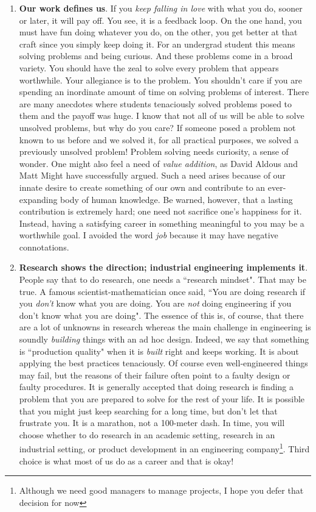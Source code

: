 \documentclass[a6paper]{article}
\begin{document}
\begin{enumerate}
    \item \textbf{Our work defines us}. If you \emph{keep falling in love} with what you do, sooner or later, it will pay off. You see, it is a feedback loop. On the one hand, you must have fun doing whatever you do, on the other, you get better at that craft since you simply keep doing it. For an undergrad student this means solving problems and being curious. And these problems come in a broad variety. You should have the zeal to solve every problem that appears worthwhile. Your allegiance is to the problem. You shouldn't care if you are spending an inordinate amount of time on solving problems of interest. There are many anecdotes where students tenaciously solved problems posed to them and the payoff was huge. I know that not all of us will be able to solve unsolved problems, but why do you care? If someone posed a problem not known to us before and we solved it, for all practical purposes, we solved a previously unsolved problem! Problem solving needs curiosity, a sense of wonder. One might also feel a need of \emph{value addition}, as David Aldous \cite{david} and Matt Might \cite{matt} have successfully argued. Such a need arises because of our innate desire to create something of our own and contribute to an ever-expanding body of human knowledge. Be warned, however, that a lasting contribution is extremely hard; one need not sacrifice one's happiness for it. Instead, having a satisfying career in something meaningful to you may be a worthwhile goal. I avoided the word \emph{job} because it may have negative connotations.
    \item \textbf{Research shows the direction; industrial engineering implements it}. People say that to do research, one needs a ``research mindset". That may be true. A famous scientist-mathematician \cite{hamming} once said, ``You are doing research if you \emph{don't} know what you are doing. You are \emph{not} doing engineering if you don't know what you are doing". The essence of this is, of course, that there are a lot of unknowns in research whereas the main challenge in engineering is soundly \emph{building} things with an ad hoc design. Indeed, we say that something is ``production quality" when it is \emph{built} right and keeps working. It is about applying the best practices tenaciously. Of course even well-engineered things may fail, but the reasons of their failure often point to a faulty design or faulty procedures.  It is generally accepted that doing research is finding a problem that you are prepared to solve for the rest of your life. It is possible that you might just keep searching for a long time, but don't let that frustrate you. It is a marathon, not a 100-meter dash. In time, you will choose whether to do research in an academic setting, research in an industrial setting, or product development in an engineering company\footnote{Although we need good managers to manage projects, I hope you defer that decision for now}. Third choice is what most of us do as a career and that is okay!

\end{enumerate}
\end{document}
